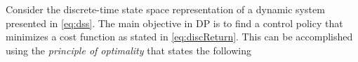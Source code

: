 Consider the discrete-time state space representation of a dynamic system presented in \eqref{eq:dss}. 
The main objective in DP is to find a control policy that minimizes a cost function as stated in \eqref{eq:discReturn}.
This can be accomplished using the \textit{principle of optimality} that states the following 
